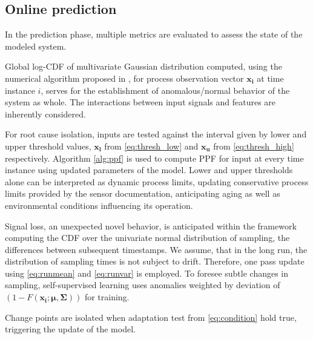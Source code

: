 \subsection{Online prediction}\label{predict}
In the prediction phase, multiple metrics are evaluated to assess the state of the modeled system.

Global log-CDF of multivariate Gaussian distribution computed, using the numerical algorithm proposed in \cite{Genz2000}, for process observation vector $\boldsymbol{x_i}$ at time instance $i$, serves for the establishment of anomalous/normal behavior of the system as whole. The interactions between input signals and features are inherently considered.

For root cause isolation, inputs are tested against the interval given by lower and upper threshold values, $\boldsymbol{x_l}$ from \eqref{eq:thresh_low} and $\boldsymbol{x_u}$ from \eqref{eq:thresh_high} respectively. Algorithm \ref{alg:ppf} is used to compute PPF for input at every time instance using updated parameters of the model. Lower and upper thresholds alone can be interpreted as dynamic process limits, updating conservative process limits provided by the sensor documentation, anticipating aging as well as environmental conditions influencing its operation.

Signal loss, an unexpected novel behavior, is anticipated within the framework computing the CDF over the univariate normal distribution of sampling, the differences between subsequent timestamps. We assume, that in the long run, the distribution of sampling times is not subject to drift. Therefore, one pass update using \eqref{eq:runmean} and \eqref{eq:runvar} is employed. To foresee subtle changes in sampling, self-supervised learning uses anomalies weighted by deviation of $(1 - F(\boldsymbol{x_i}; \boldsymbol{\mu}, \boldsymbol{\Sigma}))$ for training.

Change points are isolated when adaptation test from \eqref{eq:condition} hold true, triggering the update of the model.

